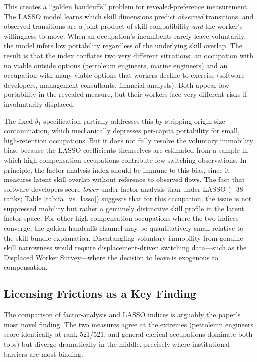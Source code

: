 \documentclass[12pt]{article}
\begin{document}
This creates a ``golden handcuffs'' problem for revealed-preference measurement. The LASSO model learns which skill dimensions predict \emph{observed} transitions, and observed transitions are a joint product of skill compatibility \emph{and} the worker's willingness to move. When an occupation's incumbents rarely leave voluntarily, the model infers low portability regardless of the underlying skill overlap. The result is that the index conflates two very different situations: an occupation with no viable outside options (petroleum engineers, marine engineers) and an occupation with many viable options that workers decline to exercise (software developers, management consultants, financial analysts). Both appear low-portability in the revealed measure, but their workers face very different risks if involuntarily displaced.

The fixed-$\delta_1$ specification partially addresses this by stripping origin-size contamination, which mechanically depresses per-capita portability for small, high-retention occupations. But it does not fully resolve the voluntary immobility bias, because the LASSO coefficients themselves are estimated from a sample in which high-compensation occupations contribute few switching observations. In principle, the factor-analysis index should be immune to this bias, since it measures latent skill overlap without reference to observed flows. The fact that software developers score \emph{lower} under factor analysis than under LASSO ($-38$ ranks; Table \ref{tab:fa_vs_lasso}) suggests that for this occupation, the issue is not suppressed mobility but rather a genuinely distinctive skill profile in the latent factor space. For other high-compensation occupations where the two indices converge, the golden handcuffs channel may be quantitatively small relative to the skill-bundle explanation. Disentangling voluntary immobility from genuine skill narrowness would require displacement-driven switching data---such as the Displaced Worker Survey---where the decision to leave is exogenous to compensation.

\subsection{Licensing Frictions as a Key Finding}

The comparison of factor-analysis and LASSO indices is arguably the paper's most novel finding. The two measures agree at the extremes (petroleum engineers score identically at rank 521/521, and general clerical occupations dominate both tops) but diverge dramatically in the middle, precisely where institutional barriers are most binding.
\end{document}
